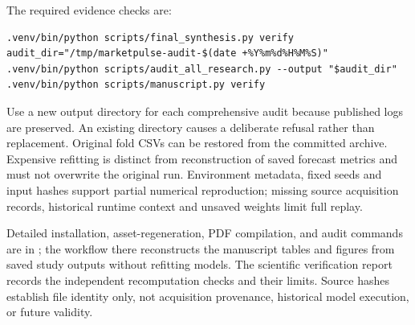 \documentclass[11pt]{article}
\begin{document}
The required evidence checks are:

\begin{verbatim}
.venv/bin/python scripts/final_synthesis.py verify
audit_dir="/tmp/marketpulse-audit-$(date +%Y%m%d%H%M%S)"
.venv/bin/python scripts/audit_all_research.py --output "$audit_dir"
.venv/bin/python scripts/manuscript.py verify
\end{verbatim}

Use a new output directory for each comprehensive audit because published logs are preserved. An existing directory causes a deliberate refusal rather than replacement. Original fold CSVs can be restored from the committed archive. Expensive refitting is distinct from reconstruction of saved forecast metrics and must not overwrite the original run. Environment metadata, fixed seeds and input hashes support partial numerical reproduction; missing source acquisition records, historical runtime context and unsaved weights limit full replay.

Detailed installation, asset-regeneration, PDF compilation, and audit commands are in ; the workflow there reconstructs the manuscript tables and figures from saved study outputs without refitting models. The scientific verification report records the independent recomputation checks and their limits. Source hashes establish file identity only, not acquisition provenance, historical model execution, or future validity.
\end{document}
